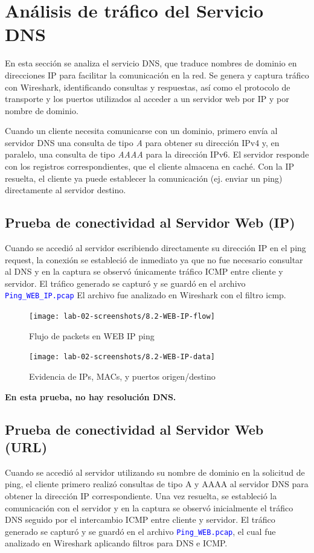 \documentclass[10pt]{article}
\begin{document}
\section{Análisis de tráfico del Servicio DNS}

En esta sección se analiza el servicio DNS, que traduce nombres de dominio en direcciones IP para facilitar la comunicación en la red. Se genera y captura tráfico con Wireshark, identificando consultas y respuestas, así como el protocolo de transporte y los puertos utilizados al acceder a un servidor web por IP y por nombre de dominio.


Cuando un cliente necesita comunicarse con un dominio, primero envía al servidor DNS una consulta de tipo \textit{A} para obtener su dirección IPv4 y, en paralelo, una consulta de tipo \textit{AAAA} para la dirección IPv6. El servidor responde con los registros correspondientes, que el cliente almacena en caché. Con la IP resuelta, el cliente ya puede establecer la comunicación (ej. enviar un ping) directamente al servidor destino.  

\subsection{Prueba de conectividad al Servidor Web (IP)}
Cuando se accedió al servidor escribiendo directamente su dirección IP en el ping request, la conexión se estableció de inmediato ya que no fue necesario consultar al DNS y en la captura se observó únicamente tráfico ICMP entre cliente y servidor. El tráfico generado se capturó y se guardó en el archivo \textcolor{blue}{\texttt{Ping\_WEB\_IP.pcap}} El archivo fue analizado en Wireshark con el filtro icmp.

\begin{figure}[H]
    \centering
    \texttt{[image: lab-02-screenshots/8.2-WEB-IP-flow]}
    \caption{Flujo de packets en WEB IP ping}
\end{figure}


\begin{figure}[H]
    \centering
    \texttt{[image: lab-02-screenshots/8.2-WEB-IP-data]}
    \caption{Evidencia de IPs, MACs, y puertos origen/destino}
\end{figure}

\textbf{En esta prueba, no hay resolución DNS.}

\subsection{Prueba de conectividad al Servidor Web (URL)}
Cuando se accedió al servidor utilizando su nombre de dominio en la solicitud de ping, el cliente primero realizó consultas de tipo A y AAAA al servidor DNS para obtener la dirección IP correspondiente. Una vez resuelta, se estableció la comunicación con el servidor y en la captura se observó inicialmente el tráfico DNS seguido por el intercambio ICMP entre cliente y servidor. El tráfico generado se capturó y se guardó en el archivo \textcolor{blue}{\texttt{Ping\_WEB.pcap}}, el cual fue analizado en Wireshark aplicando filtros para DNS e ICMP.
\end{document}

